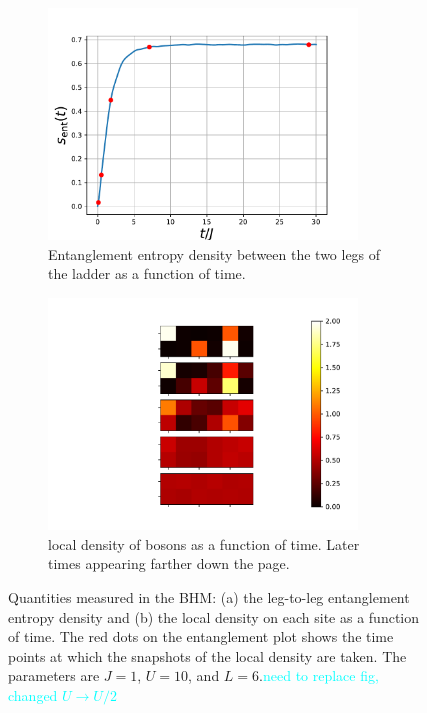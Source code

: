 \documentclass{SciPost}
\newcommand\0{\scalebox{-1}[1]{0}}
\newcommand*{\cyan}{\textcolor{cyan}}
\begin{document}
\begin{figure}[t!]
	\centering
	\begin{subfigure}[a]{0.496\textwidth}
		\includegraphics[width=0.9\textwidth]{boson_entropy.pdf}
		\caption{Entanglement entropy density between the two legs of the ladder as a function of time.}
	\end{subfigure}
	\begin{subfigure}[b]{0.496\textwidth}
		\includegraphics[width=0.9\textwidth]{boson_density.pdf}
		\caption{local density of bosons as a function of time. Later times appearing farther down the page.}
	\end{subfigure}
	\caption{\label{fig:BHM} Quantities measured in the BHM: (a) the leg-to-leg entanglement entropy density and (b) the local density on each site as a function of time. The red dots on the entanglement plot shows the time points at which the snapshots of the local density are taken. The parameters are $J=1$, $U=10$, and $L=6$.\cyan{need to replace fig, changed $U\to U/2$}}
\end{figure}
\end{document}
